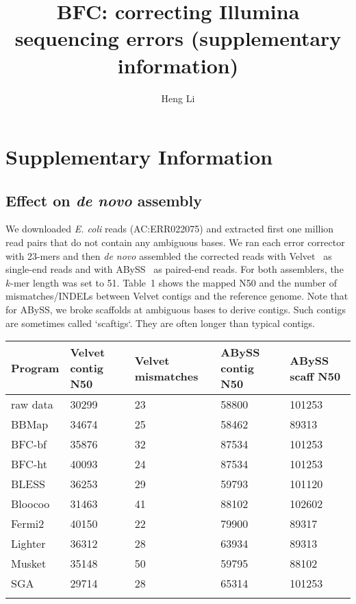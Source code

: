 \documentclass{bioinfo2}
\begin{document}

\title[Error Correction for Illumina Data]{BFC: correcting Illumina sequencing errors (supplementary information)}
\author[Li]{Heng Li}
\address{Broad Institute, 75 Ames Street, Cambridge, MA 02142, USA}
\maketitle

\section{Supplementary Information}

\subsection{Effect on {\it de novo} assembly}

We downloaded {\it E. coli} reads (AC:ERR022075) and extracted first one
million read pairs that do not contain any ambiguous bases. We ran each error
corrector with 23-mers and then {\it de novo} assembled the corrected reads
with Velvet~\citep{Zerbino:2008uq} as single-end reads and with
ABySS~\citep{Simpson:2009ys} as paired-end reads. For both assemblers, the
$k$-mer length was set to 51. Table~1 shows the mapped N50 and the number of
mismatches/INDELs between Velvet contigs and the reference genome.  Note that
for ABySS, we broke scaffolds at ambiguous bases to derive contigs. Such
contigs are sometimes called `scaftigs`. They are often longer than typical
contigs.

\begin{table}[b]
{\footnotesize
\begin{tabular}{p{1.5cm}p{1.3cm}p{1.3cm}p{1.3cm}p{1.3cm}}
\toprule
Program   & Velvet contig N50 & Velvet mismatches & ABySS contig N50 & ABySS scaff N50 \\
\midrule
raw data  & 30299 & 23 & 58800 & 101253 \\
BBMap     & 34674 & 25 & 58462 & 89313 \\
BFC-bf    & 35876 & 32 & 87534 & 101253 \\
BFC-ht    & 40093 & 24 & 87534 & 101253 \\
BLESS     & 36253 & 29 & 59793 & 101120 \\
Bloocoo   & 31463 & 41 & 88102 & 102602 \\
Fermi2    & 40150 & 22 & 79900 & 89317 \\
Lighter   & 36312 & 28 & 63934 & 89313 \\
Musket    & 35148 & 50 & 59795 & 88102 \\
SGA       & 29714 & 28 & 65314 & 101253 \\
\botrule
\end{tabular}}{}
\end{table}
\end{document}
